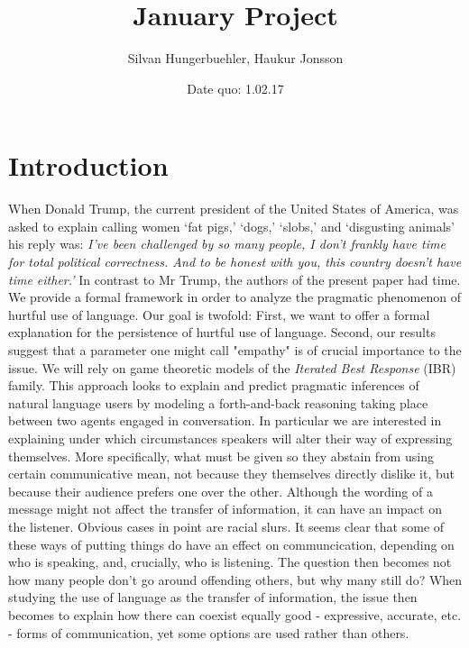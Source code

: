 \documentclass[10]{article}
\title{January Project}
\author{Silvan Hungerbuehler, Haukur Jonsson}
\date{Date quo: 1.02.17}
\begin{document}
\maketitle

\section{Introduction}
When Donald Trump, the current president of the United States of America, was asked to explain calling women ‘fat pigs,’ ‘dogs,’ ‘slobs,’ and ‘disgusting animals’ his reply was:
\textit{I’ve been challenged by so many people, I don’t frankly have time for total political correctness. And to be honest with you, this country doesn’t have time either.'}
In contrast to Mr Trump, the authors of the present paper had time. We provide a formal framework in order to analyze the pragmatic phenomenon of hurtful use of language. Our goal is twofold: First, we want to offer a formal explanation for the persistence of hurtful use of language. Second, our results suggest that a parameter one might call "empathy" is of crucial importance to the issue. 
We will rely on game theoretic models of the \textit{Iterated Best Response} (IBR) family. This approach looks to explain and predict pragmatic inferences of natural language users by modeling a forth-and-back reasoning taking place between two agents engaged in conversation. In particular we are interested in explaining under which circumstances speakers will alter their way of expressing themselves. More specifically, what must be given so they abstain from using certain communicative mean, not because they themselves directly dislike it, but because their audience prefers one over the other. Although the wording of a message might not affect the transfer of information, it can have an impact on the listener. Obvious cases in point are racial slurs. It seems clear that some of these ways of putting things do have an effect on communcication, depending on who is speaking, and, crucially, who is listening. The question then becomes not how many people don't go around offending others, but why many still do? When studying the use of language as the transfer of information, the issue then becomes to explain how there can coexist equally good - expressive, accurate, etc. - forms of communication, yet some options are used rather than others.
\end{document}
